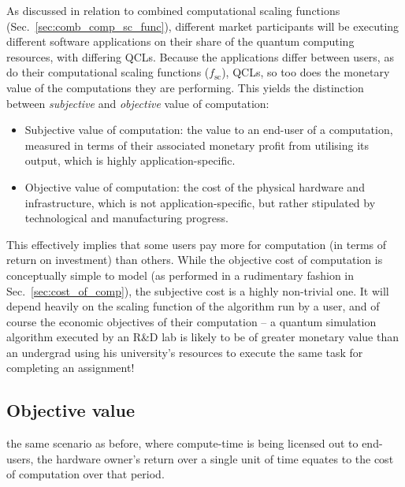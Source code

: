 As discussed in relation to combined computational scaling functions (Sec.~\ref{sec:comb_comp_sc_func}), different market participants will be executing different software applications on their share of the quantum computing resources, with differing QCLs. Because the applications differ between users, as do their computational scaling functions ($f_\mathrm{sc}$), QCLs, so too does the monetary value of the computations they are performing. This yields the distinction between \textit{subjective} and \textit{objective} value of computation:

\begin{itemize}
\item Subjective value of computation: the value to an end-user of a computation, measured in terms of their associated monetary profit from utilising its output, which is highly application-specific.
\item Objective value of computation: the cost of the physical hardware and infrastructure, which is not application-specific, but rather stipulated by technological and manufacturing progress.
\end{itemize}

This effectively implies that some users pay more for computation (in terms of return on investment) than others. While the objective cost of computation is conceptually simple to model (as performed in a rudimentary fashion in Sec.~\ref{sec:cost_of_comp}), the subjective cost is a highly non-trivial one. It will depend heavily on the scaling function of the algorithm run by a user, and of course the economic objectives of their computation -- a quantum simulation algorithm executed by an R\&D lab is likely to be of greater monetary value than an undergrad using his university's resources to execute the same task for completing an assignment!

\subsection{Objective value}

 the same scenario as before, where compute-time is being licensed out to end-users, the hardware owner's return over a single unit of time equates to the cost of computation over that period.

